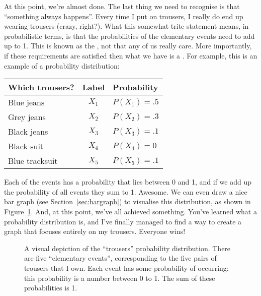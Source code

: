 At this point, we're almost done. The last thing we need to recognise is that ``something always happens''. Every time I put on trousers, I really do end up wearing trousers (crazy, right?). What this somewhat trite statement means, in probabilistic terms, is that the probabilities of the elementary events need to add up to 1. This is known as the , not that any of us really care. More importantly, if these requirements are satisfied then what we have is a . For example, this is an example of a probability distribution:
\begin{center}
\begin{tabular}{lcl}
\hline
Which trousers? & Label & Probability    \\
\hline
Blue jeans      & $X_1$ & $P(X_1) = .5 $ \\
Grey jeans      & $X_2$ & $P(X_2) = .3 $ \\
Black jeans     & $X_3$ & $P(X_3) = .1 $ \\
Black suit      & $X_4$ & $P(X_4) =  0 $ \\
Blue tracksuit  & $X_5$ & $P(X_5) = .1 $ \\
\hline
\end{tabular}
\end{center}
Each of the events has a probability that lies between 0 and 1, and if we add up the probability of all events they sum to 1. Awesome. We can even draw a nice bar graph (see Section~\ref{sec:bargraph}) to visualise this distribution, as shown in Figure~\ref{fig:pantsprob}. And, at this point, we've all achieved something. You've learned what a probability distribution is, and I've finally managed to find a way to create a graph that focuses entirely on my trousers. Everyone wins!

\begin{figure}[!!htb]
\begin{center}
\caption{A visual depiction of the ``trousers'' probability distribution. There are five ``elementary events'', corresponding to the five pairs of trousers that I own. Each event has some probability of occurring: this probability is a number between 0 to 1. The sum of these probabilities is 1.}
\label{fig:pantsprob}
\end{center}
\end{figure}

